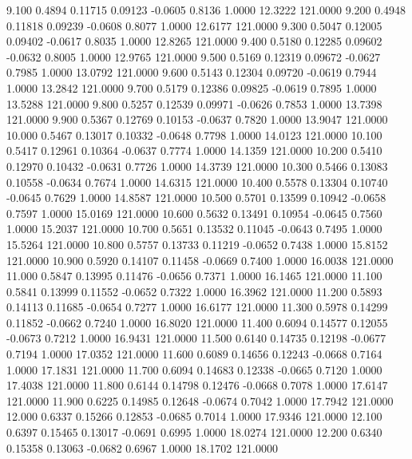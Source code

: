    9.100   0.4894   0.11715   0.09123  -0.0605   0.8136   1.0000  12.3222 121.0000
   9.200   0.4948   0.11818   0.09239  -0.0608   0.8077   1.0000  12.6177 121.0000
   9.300   0.5047   0.12005   0.09402  -0.0617   0.8035   1.0000  12.8265 121.0000
   9.400   0.5180   0.12285   0.09602  -0.0632   0.8005   1.0000  12.9765 121.0000
   9.500   0.5169   0.12319   0.09672  -0.0627   0.7985   1.0000  13.0792 121.0000
   9.600   0.5143   0.12304   0.09720  -0.0619   0.7944   1.0000  13.2842 121.0000
   9.700   0.5179   0.12386   0.09825  -0.0619   0.7895   1.0000  13.5288 121.0000
   9.800   0.5257   0.12539   0.09971  -0.0626   0.7853   1.0000  13.7398 121.0000
   9.900   0.5367   0.12769   0.10153  -0.0637   0.7820   1.0000  13.9047 121.0000
  10.000   0.5467   0.13017   0.10332  -0.0648   0.7798   1.0000  14.0123 121.0000
  10.100   0.5417   0.12961   0.10364  -0.0637   0.7774   1.0000  14.1359 121.0000
  10.200   0.5410   0.12970   0.10432  -0.0631   0.7726   1.0000  14.3739 121.0000
  10.300   0.5466   0.13083   0.10558  -0.0634   0.7674   1.0000  14.6315 121.0000
  10.400   0.5578   0.13304   0.10740  -0.0645   0.7629   1.0000  14.8587 121.0000
  10.500   0.5701   0.13599   0.10942  -0.0658   0.7597   1.0000  15.0169 121.0000
  10.600   0.5632   0.13491   0.10954  -0.0645   0.7560   1.0000  15.2037 121.0000
  10.700   0.5651   0.13532   0.11045  -0.0643   0.7495   1.0000  15.5264 121.0000
  10.800   0.5757   0.13733   0.11219  -0.0652   0.7438   1.0000  15.8152 121.0000
  10.900   0.5920   0.14107   0.11458  -0.0669   0.7400   1.0000  16.0038 121.0000
  11.000   0.5847   0.13995   0.11476  -0.0656   0.7371   1.0000  16.1465 121.0000
  11.100   0.5841   0.13999   0.11552  -0.0652   0.7322   1.0000  16.3962 121.0000
  11.200   0.5893   0.14113   0.11685  -0.0654   0.7277   1.0000  16.6177 121.0000
  11.300   0.5978   0.14299   0.11852  -0.0662   0.7240   1.0000  16.8020 121.0000
  11.400   0.6094   0.14577   0.12055  -0.0673   0.7212   1.0000  16.9431 121.0000
  11.500   0.6140   0.14735   0.12198  -0.0677   0.7194   1.0000  17.0352 121.0000
  11.600   0.6089   0.14656   0.12243  -0.0668   0.7164   1.0000  17.1831 121.0000
  11.700   0.6094   0.14683   0.12338  -0.0665   0.7120   1.0000  17.4038 121.0000
  11.800   0.6144   0.14798   0.12476  -0.0668   0.7078   1.0000  17.6147 121.0000
  11.900   0.6225   0.14985   0.12648  -0.0674   0.7042   1.0000  17.7942 121.0000
  12.000   0.6337   0.15266   0.12853  -0.0685   0.7014   1.0000  17.9346 121.0000
  12.100   0.6397   0.15465   0.13017  -0.0691   0.6995   1.0000  18.0274 121.0000
  12.200   0.6340   0.15358   0.13063  -0.0682   0.6967   1.0000  18.1702 121.0000
